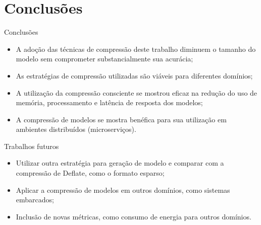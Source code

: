 \section{Conclusões}
\begin{frame}{Conclusões}
    \scriptsize
    \begin{itemize}
        \item A adoção das técnicas de compressão deste trabalho diminuem o tamanho do modelo sem comprometer substancialmente sua acurácia;
        \item As estratégias de compressão utilizadas são viáveis para diferentes domínios;
        \item A utilização da compressão consciente se mostrou eficaz na redução do uso de memória, processamento e latência de resposta dos modelos;
        \item A compressão de modelos se mostra benéfica para sua utilização em ambientes distribuídos (microserviços).
    \end{itemize}
\end{frame}

\begin{frame}{Trabalhos futuros}
    \scriptsize
    \begin{itemize}
        \item Utilizar outra estratégia para geração de modelo e comparar com a compressão de Deflate, como o formato esparso;
        \item Aplicar a compressão de modelos em outros domínios, como sistemas embarcados;
        \item Inclusão de novas métricas, como consumo de energia para outros domínios.
    \end{itemize}
\end{frame}